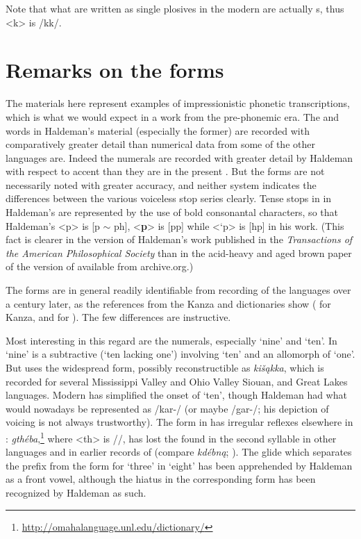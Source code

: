 \documentclass[output=paper]{LSP/langsci}
\begin{document}
 
Note that what are written as single plosives in the modern   are actually s, thus <k> is /kk/.  

\section{Remarks on the forms}
The materials here represent examples of impressionistic phonetic transcriptions, which is what we would expect in a work from the pre-phonemic era.  The  and  words in Haldeman's material (especially the former) are recorded with comparatively greater detail than numerical data from some of the other languages are.  Indeed the  numerals are recorded with greater detail by Haldeman with respect to accent than they are in the present .  But the forms are not necessarily noted with greater accuracy, and neither system indicates the differences between the various voiceless stop series clearly.   Tense stops in  in Haldeman's  are represented by the use of bold consonantal characters, so that  Haldeman's <p> is [p $\sim$ ph], <\textbf{p}> is [pp] while <`p> is [hp] in his  work. (This fact is clearer in the version of Haldeman's work published in the \textit{Transactions of the American Philosophical Society} than in the acid-heavy and aged brown paper of the version of \citealt{Haldeman1860} available from archive.org.)  
 

The forms are in general readily identifiable from recording of the languages over a century later, as the references from the Kanza and  dictionaries show (\citealt{CumberlandRankin2012} for Kanza, and \citealt{Quintero2009} for ). The few differences are instructive.    

 
Most interesting in this regard are the numerals, especially `nine' and `ten'.  In  `nine' is a subtractive  (`ten lacking one') involving `ten' and an allomorph of `one'.  But   uses the widespread form, possibly reconstructible as \textit{ki\v{s}\k{a}kka}, which is recorded for several Mississippi Valley and Ohio Valley Siouan,  and Great Lakes  languages.   Modern  has simplified the onset of `ten', though Haldeman had what would nowadays be represented as /kar-/ (or maybe /gar-/; his depiction of voicing is not always trustworthy).  The form in  has irregular reflexes elsewhere in :    \textit{gthéba},\footnote{\url{http://omahalanguage.unl.edu/dictionary/}} where <th> is //, has lost the  found in the second syllable in other  languages and in earlier records of  (compare  \textit{kdébn\k{a}}; \citealt[3]{Rankin1982}). The glide which separates the prefix from the form for `three' in  `eight' has been apprehended by Haldeman as a front vowel, although the hiatus in the corresponding  form has been recognized by Haldeman as such.  
\end{document}
